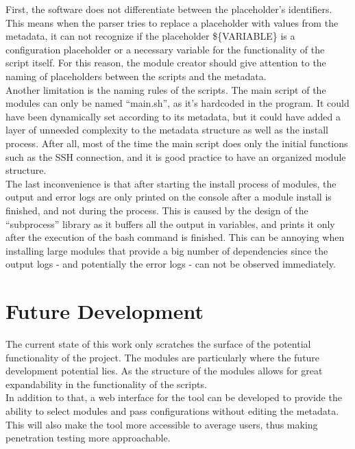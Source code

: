 First, the software does not differentiate between the placeholder’s identifiers. This means when the parser tries to replace a placeholder with values from the metadata, it can not recognize if the placeholder \$\{VARIABLE\} is a configuration placeholder or a necessary variable for the functionality of the script itself. For this reason, the module creator should give attention to the naming of placeholders between the scripts and the metadata.\\
Another limitation is the naming rules of the scripts. The main script of the modules can only be named “main.sh”, as it’s hardcoded in the program. It could have been dynamically set according to its metadata, but it could have added a layer of unneeded complexity to the metadata structure as well as the install process. After all, most of the time the main script does only the initial functions such as the SSH connection, and it is good practice to have an organized module structure.\\
The last inconvenience is that after starting the install process of modules, the output and error logs are only printed on the console after a module install is finished, and not during the process. This is caused by the design of the “subprocess” library as it buffers all the output in variables, and prints it only after the execution of the bash command is finished. This can be annoying when installing large modules that provide a big number of dependencies since the output logs - and potentially the error logs - can not be observed immediately.

\section{Future Development}
The current state of this work only scratches the surface of the potential functionality of the project. The modules are particularly where the future development potential lies. As the structure of the modules allows for great expandability in the functionality of the scripts.\\
In addition to that, a web interface for the tool can be developed to provide the ability to select modules and pass configurations without editing the metadata. This will also make the tool more accessible to average users, thus making penetration testing more approachable.

